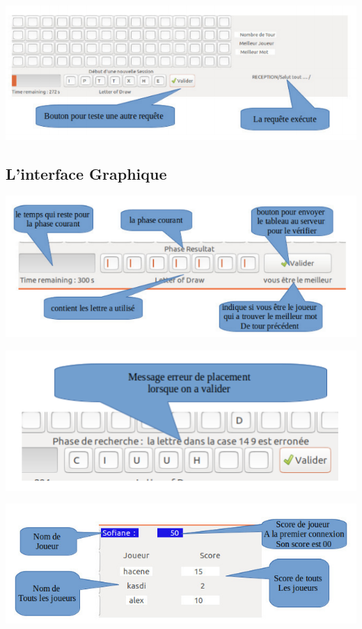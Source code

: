 \documentclass[french]{article}
\begin{document}
\includegraphics[width=1\textwidth]{images/1.png}
    
\subsection{ L’interface Graphique }

\includegraphics[width=1\textwidth]{images/2.png}
    
\includegraphics[width=1\textwidth]{images/3.png}
    
\includegraphics[width=1\textwidth]{images/4.png}
    
\end{document}
